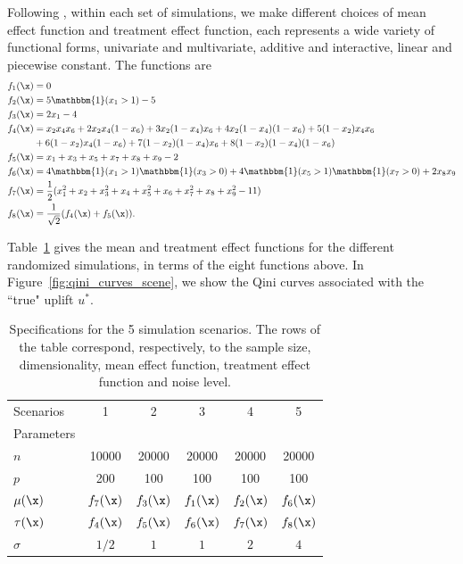 Following \cite{powers2018some},  within each set of simulations, we make different choices of mean effect function and treatment effect function, each represents a wide variety of functional forms, univariate and multivariate, additive and interactive, linear and  piecewise constant. The functions are
\begin{align*}
    f_1(\x) &= 0 \\
    f_2(\x) &= 5 \mathbbm{1}(x_1 > 1) - 5\\
    f_3(\x) &= 2 x_1 - 4 \\
    f_4(\x) &= x_2 x_4 x_6 + 2 x_2 x_4 (1-x_6) +3x_2(1-x_4)x_6 + 4x_2(1-x_4)(1-x_6) + 5(1-x_2)x_4x_6 \\
            &+ 6(1-x_2)x_4(1-x_6) + 7 (1-x_2)(1-x_4)x_6 + 8(1-x_2)(1-x_4)(1-x_6)\\
    f_5(\x) &= x_1 + x_3 + x_5 + x_7 + x_8 + x_9 - 2\\
    f_6(\x) &= 4 \mathbbm{1}(x_1 > 1)\mathbbm{1}(x_3 > 0) + 4\mathbbm{1}(x_5 > 1)\mathbbm{1}(x_7 > 0) + 2x_8x_9\\
    f_7(\x) &= \frac{1}{2} (x_1^2 + x_2 + x_3^2 + x_4 + x_5^2 + x_6 + x_7^2 + x_8 + x_9^2 - 11)\\
    f_8(\x) &= \frac{1}{\sqrt{2}} (f_4(\x) + f_5(\x)).
\end{align*}

Table~\ref{tab:scenarios} gives the mean and treatment effect functions for the different randomized simulations, in terms of the eight functions above. In Figure~\ref{fig:qini_curves_scene}, we show the Qini curves associated with the ``true" uplift $u^*$. 


\begin{table}[!ht]
    \centering
    \caption{Specifications for the 5 simulation scenarios. The rows of the table correspond, respectively, to the sample size, dimensionality, mean effect function, treatment effect function and noise level.}
    \label{tab:scenarios}
    \begin{tabular}{l|ccccc}
        Scenarios & 1 & 2 & 3 & 4 & 5\\
        Parameters & & & & & \\
        \hline
        $n$ & 10000 & 20000 & 20000 & 20000 & 20000 \\
        $p$ & 200 & 100 & 100 & 100 & 100 \\
        $\mu(\x)$ & $f_7(\x)$ & $f_3(\x)$ & $f_1(\x)$ & $f_2(\x)$ & $f_6(\x)$\\
        $\tau(\x)$ & $f_4(\x)$ & $f_5(\x)$ & $f_6(\x)$ &$ f_7(\x)$ & $f_8(\x)$\\
        $\sigma$ & $1/2$ & $1$ & $1$ & $2$ & $4$\\
        \hline
    \end{tabular}
\end{table}


